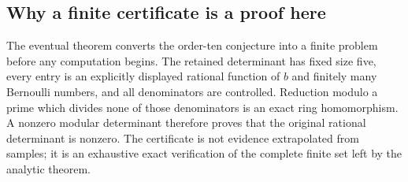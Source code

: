 \subsection{Why a finite certificate is a proof here}

The eventual theorem converts the order-ten conjecture into a finite
problem before any computation begins.  The retained determinant has
fixed size five, every entry is an explicitly displayed rational
function of $b$ and finitely many Bernoulli numbers, and all denominators
are controlled.  Reduction modulo a prime which divides none of those
denominators is an exact ring homomorphism.  A nonzero modular
determinant therefore proves that the original rational determinant is
nonzero.  The certificate is not evidence extrapolated from samples;
it is an exhaustive exact verification of the complete finite set left
by the analytic theorem.
